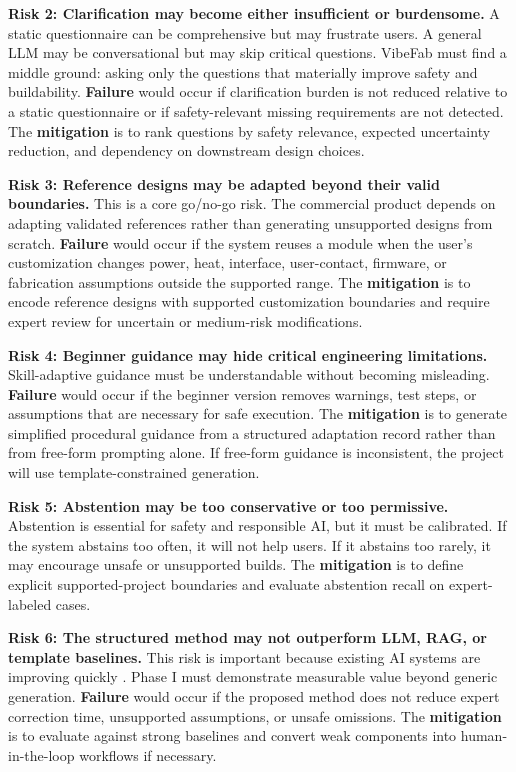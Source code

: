 \textbf{Risk 2: Clarification may become either insufficient or burdensome.}
A static questionnaire can be comprehensive but may frustrate users. A general LLM may be conversational but may skip critical questions. VibeFab must find a middle ground: asking only the questions that materially improve safety and buildability. \textbf{Failure} would occur if clarification burden is not reduced relative to a static questionnaire or if safety-relevant missing requirements are not detected. The \textbf{mitigation} is to rank questions by safety relevance, expected uncertainty reduction, and dependency on downstream design choices.

\textbf{Risk 3: Reference designs may be adapted beyond their valid boundaries.}
This is a core go/no-go risk. The commercial product depends on adapting validated references rather than generating unsupported designs from scratch. \textbf{Failure} would occur if the system reuses a module when the user's customization changes power, heat, interface, user-contact, firmware, or fabrication assumptions outside the supported range. The \textbf{mitigation} is to encode reference designs with supported customization boundaries and require expert review for uncertain or medium-risk modifications.

\textbf{Risk 4: Beginner guidance may hide critical engineering limitations.}
Skill-adaptive guidance must be understandable without becoming misleading. \textbf{Failure} would occur if the beginner version removes warnings, test steps, or assumptions that are necessary for safe execution. The \textbf{mitigation} is to generate simplified procedural guidance from a structured adaptation record rather than from free-form prompting alone. If free-form guidance is inconsistent, the project will use template-constrained generation.

\textbf{Risk 5: Abstention may be too conservative or too permissive.}
Abstention is essential for safety and responsible AI, but it must be calibrated. If the system abstains too often, it will not help users. If it abstains too rarely, it may encourage unsafe or unsupported builds. The \textbf{mitigation} is to define explicit supported-project boundaries and evaluate abstention recall on expert-labeled cases.

\textbf{Risk 6: The structured method may not outperform LLM, RAG, or template baselines.}
This risk is important because existing AI systems are improving quickly \cite{denny2024gaied,wang2024llmedu,xu2024llmedusurvey,srinivasan2026pcbgenai}. Phase I must demonstrate measurable value beyond generic generation. \textbf{Failure} would occur if the proposed method does not reduce expert correction time, unsupported assumptions, or unsafe omissions. The \textbf{mitigation} is to evaluate against strong baselines and convert weak components into human-in-the-loop workflows if necessary.

